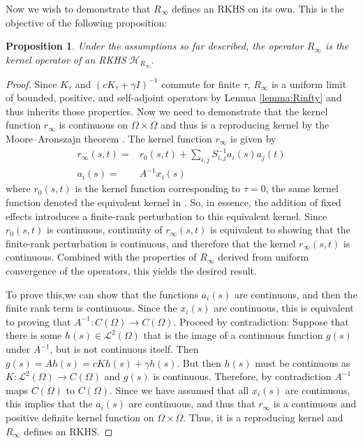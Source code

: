 \documentclass[ejsv2,preprint]{imsart}
\newtheorem{prop}{Proposition}[section]
\begin{document}
Now we wish to demonstrate that $R_\infty$ defines an RKHS on its own. This is the objective of the following proposition:
\begin{prop}\label{prop:Rinfty_defines_rkhs}
    Under the assumptions so far described, the operator $R_{\infty}$ is the kernel operator of an RKHS $\mathcal H_{R_\infty}$.
\end{prop}
\begin{proof}
    Since $K_\tau$ and $(cK_\tau+\gamma I)^{-1}$ commute for finite $\tau$, $R_\infty$ is a uniform limit of bounded, positive, and self-adjoint operators by Lemma \ref{lemma:Rinfty} and thus inherits those properties. Now we need to demonstrate that the kernel function $r_\infty$ is continuous on $\Omega\times \Omega$ and thus is a reproducing kernel by the Moore–Aronszajn theorem \cite{rkhs_book}. The kernel function $r_\infty$ is given by
\begin{equation}
    \label{eq:rinfty_kernelfn}
    \begin{split}
        r_\infty(s,t) =& r_0(s,t)+\sum_{i,j}S^{-1}_{i,j}a_i(s)a_j(t)\\
        a_i(s) =& A^{-1}x_i(s) 
    \end{split}
\end{equation}
where $r_0(s,t)$ is the kernel function corresponding to $\tau=0$, the same kernel function denoted the equivalent kernel in \cite{pmlr-v54-flaxman17a}. So, in essence, the addition of fixed effects introduces a finite-rank perturbation to this equivalent kernel. Since $r_0(s,t)$ is continuous, continuity of $r_\infty(s,t)$ is equivalent to showing that the finite-rank perturbation is continuous, and therefore that the kernel $r_\infty(s,t)$ is continuous. Combined with the properties of $R_\infty$ derived from uniform convergence of the operators, this yields the desired result. 

To prove this,we can show that the functions $a_i(s)$ are continuous, and then the finite rank term is continuous. Since the $x_i(s)$ are continuous, this is equivalent to proving that $A^{-1}:C(\Omega)\to C(\Omega)$. Proceed by contradiction: Suppose that there is some $h(s)\in \mathcal{L}^2(\Omega)$ that is the image of a continuous function $g(s)$ under $A^{-1}$, but is not continuous itself. Then $g(s)=Ah(s)=cK h(s)+\gamma h(s)$. But then $h(s)$ must be continuous as $K:\mathcal{L}^2(\Omega)\to C(\Omega)$ and $g(s)$ is continuous. Therefore, by contradiction $A^{-1}$ maps $C(\Omega)$ to $C(\Omega)$. Since we have assumed that all $x_i(s)$ are continuous, this implies that the $a_i(s)$ are continuous, and thus that $r_\infty$ is a continuous and positive definite kernel function on $\Omega\times \Omega$. Thus, it is a reproducing kernel and $R_\infty$ defines an RKHS.
\end{proof}
\end{document}
